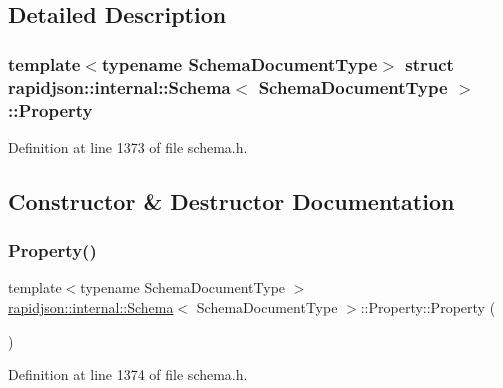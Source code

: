 \subsection{Detailed Description}
\subsubsection*{template$<$typename Schema\+Document\+Type$>$\newline
struct rapidjson\+::internal\+::\+Schema$<$ Schema\+Document\+Type $>$\+::\+Property}



Definition at line 1373 of file schema.\+h.



\subsection{Constructor \& Destructor Documentation}
\mbox{\label{structrapidjson_1_1internal_1_1_schema_1_1_property_ae57b1bcbf4c4762779462ff42ab47c27}} 
\subsubsection{\texorpdfstring{Property()}{Property()}}
{\footnotesize\ttfamily template$<$typename Schema\+Document\+Type $>$ \\
\mbox{\hyperlink{classrapidjson_1_1internal_1_1_schema}{rapidjson\+::internal\+::\+Schema}}$<$ Schema\+Document\+Type $>$\+::Property\+::\+Property (\begin{DoxyParamCaption}{ }\end{DoxyParamCaption})}



Definition at line 1374 of file schema.\+h.


